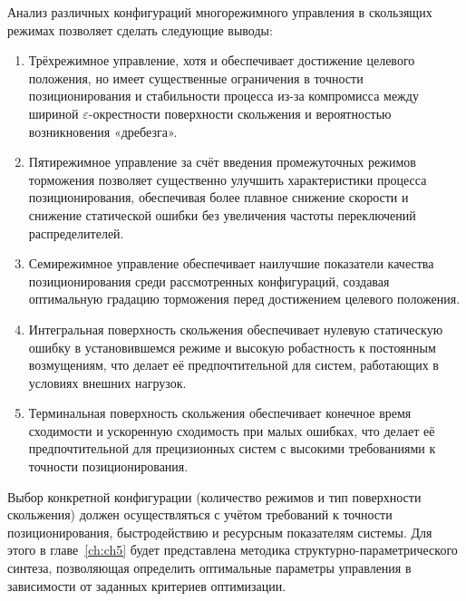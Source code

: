 Анализ различных конфигураций многорежимного управления в скользящих режимах позволяет сделать следующие выводы:

\begin{enumerate}
	\item Трёхрежимное управление, хотя и обеспечивает достижение целевого положения, но имеет существенные
	      ограничения в точности позиционирования и стабильности процесса из-за компромисса между шириной $\varepsilon$-окрестности
	      поверхности скольжения и вероятностью возникновения «дребезга».

	\item Пятирежимное управление за счёт введения промежуточных режимов торможения позволяет существенно
	      улучшить характеристики процесса позиционирования, обеспечивая более плавное снижение
	      скорости и снижение статической ошибки без увеличения частоты переключений распределителей.

	\item Семирежимное управление обеспечивает наилучшие показатели качества позиционирования
	      среди рассмотренных конфигураций, создавая оптимальную градацию торможения перед достижением целевого положения.

	\item Интегральная поверхность скольжения обеспечивает нулевую статическую ошибку в
	      установившемся режиме и высокую робастность к постоянным возмущениям, что делает её предпочтительной для систем, работающих в условиях внешних нагрузок.

	\item Терминальная поверхность скольжения обеспечивает конечное время сходимости и
	      ускоренную сходимость при малых ошибках, что делает её предпочтительной для прецизионных систем с высокими требованиями к точности позиционирования.
\end{enumerate}

Выбор конкретной конфигурации (количество режимов и тип поверхности скольжения) должен осуществляться с учётом
требований к точности позиционирования, быстродействию и ресурсным показателям системы. Для этого в главе~\ref{ch:ch5} будет
представлена методика структурно-параметрического синтеза, позволяющая определить оптимальные параметры управления в зависимости от заданных критериев оптимизации.